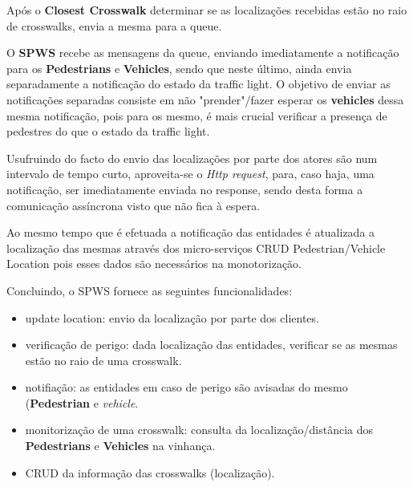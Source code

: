 \documentclass[acmsmall,nonacm,screen]{acmart}
\begin{document}
\hspace{5mm} Após o \textbf{Closest Crosswalk} determinar se as localizações recebidas estão no raio de crosswalks, envia a mesma para a queue.

\hspace{5mm} O \textbf{SPWS} recebe as mensagens da queue, enviando imediatamente a notificação para os \textbf{Pedestrians} e \textbf{Vehicles}, sendo que neste último, ainda envia separadamente a notificação do estado da traffic light. O objetivo de enviar as notificações separadas consiste em não "prender"/fazer esperar os \textbf{vehicles} dessa mesma notificação, pois para os mesmo, é mais crucial verificar a presença de pedestres do que o estado da traffic light.

\hspace{5mm} Usufruindo do facto do envio das localizações por parte dos atores são num intervalo de tempo curto, aproveita-se o \textit{Http request}, para, caso haja, uma notificação, ser imediatamente enviada no response, sendo desta forma a comunicação assíncrona visto que não fica à espera.  

\hspace{5mm} Ao mesmo tempo que é efetuada a notificação das entidades é atualizada a localização das mesmas através dos micro-serviços CRUD Pedestrian/Vehicle Location pois esses dados são necessários na monotorização. 
\newline 

\hspace{5mm} Concluindo, o SPWS fornece as seguintes funcionalidades:
\newline

\begin{itemize}
    \item update location: envio da localização por parte dos clientes.
    \item verificação de perigo: dada localização das entidades, verificar se as mesmas estão no raio de uma crosswalk.
    \item notifiação: as entidades em caso de perigo são avisadas do mesmo (\textbf{Pedestrian} e \textit{vehicle}.
    \item monitorização de uma crosswalk: consulta da localização/distância dos \textbf{Pedestrians} e \textbf{Vehicles} na vinhança.
    \item CRUD da informação das crosswalks (localização).
\end{itemize}
\end{document}
